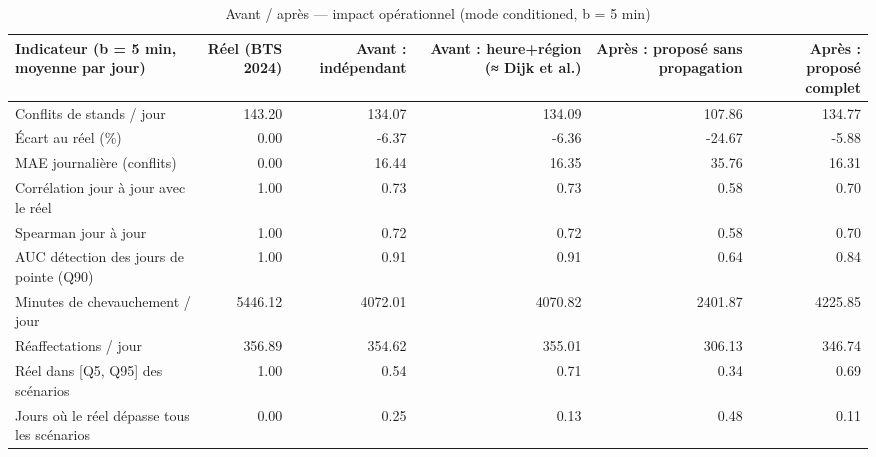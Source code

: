 \begin{table}
\caption{Avant / après — impact opérationnel (mode conditioned, b = 5 min)}
\label{tab:T3b_conditioned}
\begin{tabular}{lrrrrr}
\toprule
Indicateur (b = 5 min, moyenne par jour) & Réel (BTS 2024) & Avant : indépendant & Avant : heure+région (≈ Dijk et al.) & Après : proposé sans propagation & Après : proposé complet \\
\midrule
Conflits de stands / jour & 143.20 & 134.07 & 134.09 & 107.86 & 134.77 \\
Écart au réel (\%) & 0.00 & -6.37 & -6.36 & -24.67 & -5.88 \\
MAE journalière (conflits) & 0.00 & 16.44 & 16.35 & 35.76 & 16.31 \\
Corrélation jour à jour avec le réel & 1.00 & 0.73 & 0.73 & 0.58 & 0.70 \\
Spearman jour à jour & 1.00 & 0.72 & 0.72 & 0.58 & 0.70 \\
AUC détection des jours de pointe (Q90) & 1.00 & 0.91 & 0.91 & 0.64 & 0.84 \\
Minutes de chevauchement / jour & 5446.12 & 4072.01 & 4070.82 & 2401.87 & 4225.85 \\
Réaffectations / jour & 356.89 & 354.62 & 355.01 & 306.13 & 346.74 \\
Réel dans [Q5, Q95] des scénarios & 1.00 & 0.54 & 0.71 & 0.34 & 0.69 \\
Jours où le réel dépasse tous les scénarios & 0.00 & 0.25 & 0.13 & 0.48 & 0.11 \\
\bottomrule
\end{tabular}
\end{table}
